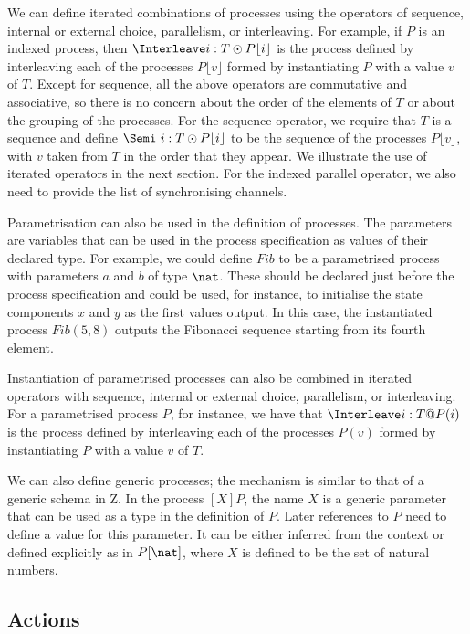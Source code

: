 \documentclass{article}
\begin{document}
We can define iterated combinations of processes using the operators
of sequence, internal or external choice, parallelism, or
interleaving.  For example, if $P$ is an indexed process, then
$\Interleave i: T \odot P\lfloor i\rfloor$ is the process defined by
interleaving each of the processes $P\lfloor v\rfloor$ formed by
instantiating $P $ with a value $v$ of $T$.  Except for sequence, all
the above operators are commutative and associative, so there is no
concern about the order of the elements of $T$ or about the grouping
of the processes.  For the sequence operator, we require that $T$ is a
sequence and define $\Semi\ i: T \odot P\lfloor i\rfloor$ to be the
sequence of the processes $P\lfloor v\rfloor$, with $v$ taken from $T$
in the order that they appear.  We illustrate the use of iterated
operators in the next section.  For the indexed parallel operator, we
also need to provide the list of synchronising channels.

Parametrisation can also be used in the definition of processes.  The
parameters are variables that can be used in the process specification
as values of their declared type.  For example, we could define $Fib $
to be a parametrised process with parameters $a$ and $b$ of type
$\nat$.  These should be declared just before the process
specification and could be used, for instance, to initialise the state
components $x$ and $y$ as the first values output.  In this case, the
instantiated process $Fib(5,8)$ outputs the Fibonacci sequence
starting from its fourth element.

Instantiation of parametrised processes can also be combined in
iterated operators with sequence, internal or external choice,
parallelism, or interleaving.  For a parametrised process $P$, for
instance, we have that $\Interleave i: T @ P(i)$ is the process
defined by interleaving each of the processes $P(v)$ formed by
instantiating $P$ with a value $v$ of $T$.

We can also define generic processes; the mechanism is similar to that
of a generic schema in Z.  In the process $[X]P$, the name $X$ is a
generic parameter that can be used as a type in the definition of $P$.
Later references to $P$ need to define a value for this parameter.  It
can be either inferred from the context or defined explicitly as in
$P[\nat]$, where $X$ is defined to be the set of natural numbers.

\subsection{Actions}
\end{document}
